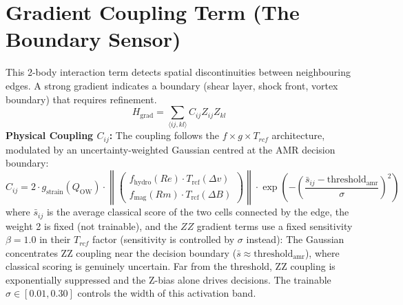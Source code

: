 \documentclass[12pt, a4paper, oneside]{report}
\begin{document}
\section{Gradient Coupling Term (The Boundary Sensor)}
This 2-body interaction term detects spatial discontinuities between neighbouring edges. A strong gradient indicates a boundary (shear layer, shock front, vortex boundary) that requires refinement.
\begin{equation}
    H_{\text{grad}} = \sum_{\langle ij, kl \rangle} C_{ij} Z_{ij} Z_{kl}
\end{equation}
\textbf{Physical Coupling $C_{ij}$:} The coupling follows the $f \times g \times T_{rcf}$ architecture, modulated by an uncertainty-weighted Gaussian centred at the AMR decision boundary:
\begin{equation}
    C_{ij} = 2 \cdot g_{\text{strain}}(Q_{\text{OW}}) \cdot \left\|\begin{pmatrix} f_{\text{hydro}}(Re) \cdot T_{\text{rcf}}(\Delta v) \\ f_{\text{mag}}(Rm) \cdot T_{\text{rcf}}(\Delta B) \end{pmatrix}\right\|
    \cdot \exp\!\left(-\left(\frac{\bar{s}_{ij} - \text{threshold}_{\text{amr}}}{\sigma}\right)^{\!2}\right)
\end{equation}
where $\bar{s}_{ij}$ is the average classical score of the two cells connected by the edge, the weight 2 is fixed (not trainable), and the $ZZ$ gradient terms use a fixed sensitivity $\beta = 1.0$ in their $T_{rcf}$ factor (sensitivity is controlled by $\sigma$ instead):
The Gaussian concentrates ZZ coupling near the decision boundary ($\bar{s} \approx \text{threshold}_{\text{amr}}$), where classical scoring is genuinely uncertain. Far from the threshold, ZZ coupling is exponentially suppressed and the Z-bias alone drives decisions. The trainable $\sigma \in [0.01, 0.30]$ controls the width of this activation band.
\end{document}

